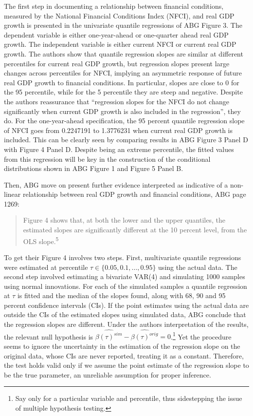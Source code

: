 \documentclass[12pt,]{article}
\let\rmarkdownfootnote\footnote%
\def\footnote{\protect\rmarkdownfootnote}
\begin{document}
The first step in documenting a relationship between financial
conditions, measured by the National Financial Conditions Index (NFCI),
and real GDP growth is presented in the univariate quantile regressions
of ABG Figure 3. The dependent variable is either one-year-ahead or
one-quarter ahead real GDP growth. The independent variable is either
current NFCI or current real GDP growth. The authors show that quantile
regression slopes are similar at different percentiles for current real
GDP growth, but regression slopes present large changes across
percentiles for NFCI, implying an asymmetric response of future real GDP
growth to financial conditions. In particular, slopes are close to 0 for
the 95 percentile, while for the 5 percentile they are steep and
negative. Despite the authors reassurance that ``regression slopes for
the NFCI do not change significantly when current GDP growth is also
included in the regression'', they do. For the one-year-ahead
specification, the 95 percent quantile regression slope of NFCI goes
from 0.2247191 to 1.3776231 when current real GDP growth is included.
This can be clearly seen by comparing results in ABG Figure 3 Panel D
with Figure 4 Panel D. Despite being an extreme percentile, the fitted
values from this regression will be key in the construction of the
conditional distributions shown in ABG Figure 1 and Figure 5 Panel B.

Then, ABG move on present further evidence interpreted as indicative of
a non-linear relationship between real GDP growth and financial
conditions, ABG page 1269:

\begin{quote}
Figure 4 shows that, at both the lower and the upper quantiles, the
estimated slopes are significantly different at the 10 percent level,
from the OLS slope.\textsuperscript{5}
\end{quote}

To get their Figure 4 involves two steps. First, multivariate quantile
regressions were estimated at percentile
\(\tau \in \{0.05, 0.1,\dots, 0.95\}\) using the actual data. The second
step involved estimating a bivariate VAR(4) and simulating 1000 samples
using normal innovations. For each of the simulated samples a quantile
regression at \(\tau\) is fitted and the median of the slopes found,
along with 68, 90 and 95 percent confidence intervals (CIs). If the
point estimates using the actual data are outside the CIs of the
estimated slopes using simulated data, ABG conclude that the regression
slopes are different. Under the authors interpretation of the results,
the relevant null hypothesis is
\(\widehat{\beta(\tau)^{sim}} - \widehat{\beta(\tau)^{orig}} = 0\).\footnote{Say only for a particular variable and percentile, thus sidestepping the issue of multiple hypothesis testing.}
Yet the procedure seems to ignore the uncertainty in the estimation of
the regression slope on the original data, whose CIs are never reported,
treating it as a constant. Therefore, the test holds valid only if we
assume the point estimate of the regression slope to be the true
parameter, an unreliable assumption for proper inference.
\end{document}
